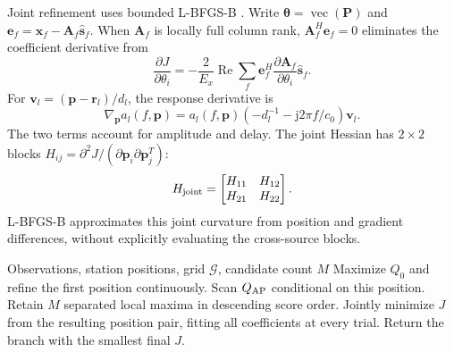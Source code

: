 \documentclass[a4paper,fleqn,review]{cas-sc}
\newcommand{\Rea}{\operatorname{Re}}
\begin{document}
Joint refinement uses bounded L-BFGS-B \cite{Byrd1995}. Write $\bm\theta=\operatorname{vec}(\bm P)$ and $\bm e_f=\bm x_f-\bm A_f\widehat{\bm s}_f$. When $\bm A_f$ is locally full column rank, $\bm A_f^H\bm e_f=0$ eliminates the coefficient derivative from
\begin{equation}
\frac{\partial J}{\partial\theta_i}=-\frac{2}{E_x}\Rea\sum_f
 \bm e_f^H\frac{\partial\bm A_f}{\partial\theta_i}\widehat{\bm s}_f.
\label{en:gradient}
\end{equation}
For $\bm v_l=(\bm p-\bm r_l)/d_l$, the response derivative is
\begin{equation}
\nabla_{\bm p}a_l(f,\bm p)=a_l(f,\bm p)
 (-d_l^{-1}-\mathrm j2\pi f/c_0)\bm v_l.
\end{equation}
The two terms account for amplitude and delay. The joint Hessian has $2\times2$ blocks $H_{ij}=\partial^2J/(\partial\bm p_i\partial\bm p_j^T)$:
\begin{equation}
H_{\rm joint}=\begin{bmatrix}H_{11}&H_{12}\\H_{21}&H_{22}\end{bmatrix}.
\end{equation}
L-BFGS-B approximates this joint curvature from position and gradient differences, without explicitly evaluating the cross-source blocks.

\begin{algorithm}[H]
\caption{MCJ-AP}\label{en:algap}
\begin{algorithmic}[1]
\Require Observations, station positions, grid $\mathcal G$, candidate count $M$
\State Maximize $Q_0$ and refine the first position continuously.
\State Scan $Q_{\rm AP}$ conditional on this position.
\State Retain $M$ separated local maxima in descending score order.
\State Jointly minimize $J$ from the resulting position pair, fitting all coefficients at every trial.
\EndFor
\State Return the branch with the smallest final $J$.
\end{algorithmic}
\end{algorithm}

\FloatBarrier
\end{document}
